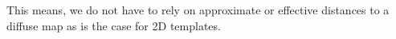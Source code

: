 \documentclass[doublespace,nopageskip]{VTthesis} %
\begin{document}
\begin{appendices}
	\noindent This means, we do not have to rely on approximate or effective distances to a diffuse map as is the case for 2D templates.
	
	
	

\end{appendices}
\end{document}
